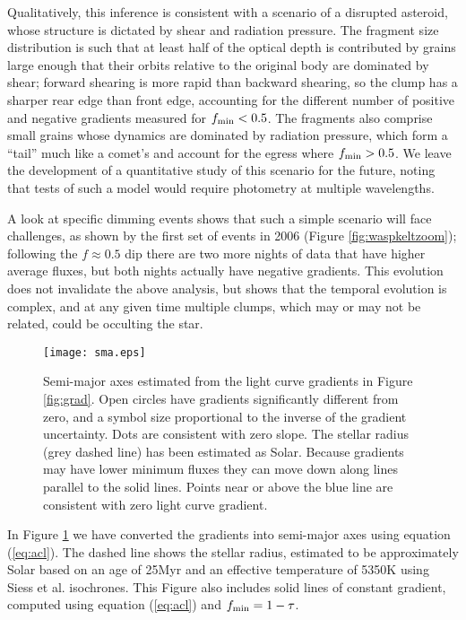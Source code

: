 \documentclass[]{rsos}
\begin{document}
Qualitatively, this inference is consistent with a scenario of a disrupted asteroid,
whose structure is dictated by shear and radiation pressure. The fragment size
distribution is such that at least half of the optical depth is contributed by grains
large enough that their orbits relative to the original body are dominated by shear;
forward shearing is more rapid than backward shearing, so the clump has a sharper rear
edge than front edge, accounting for the different number of positive and negative
gradients measured for $f_{\rm min} < 0.5$. The fragments also comprise small grains
whose dynamics are dominated by radiation pressure, which form a ``tail'' much like a
comet's and account for the egress where $f_{\rm min} > 0.5$. We leave the development of
a quantitative study of this scenario for the future, noting that tests of such a model
would require photometry at multiple wavelengths.

A look at specific dimming events shows that such a simple scenario will face challenges,
as shown by the first set of events in 2006 (Figure \ref{fig:waspkeltzoom}); following
the $f \approx 0.5$ dip there are two more nights of data that have higher average
fluxes, but both nights actually have negative gradients. This evolution does not
invalidate the above analysis, but shows that the temporal evolution is complex, and at
any given time multiple clumps, which may or may not be related, could be occulting the
star.

\begin{figure}
  \begin{center}
    \hspace{-0.5cm} \texttt{[image: sma.eps]}
    \caption{Semi-major axes estimated from the light curve gradients in Figure
      \ref{fig:grad}. Open circles have gradients significantly different from zero, and
      a symbol size proportional to the inverse of the gradient uncertainty. Dots are
      consistent with zero slope. The stellar radius (grey dashed line) has been
      estimated as Solar. Because gradients may have lower minimum fluxes they can move
      down along lines parallel to the solid lines. Points near or above the blue line
      are consistent with zero light curve gradient.}\label{fig:sma}
  \end{center}
\end{figure}

In Figure \ref{fig:sma} we have converted the gradients into semi-major axes using
equation (\ref{eq:acl}). The dashed line shows the stellar radius, estimated to be
approximately Solar based on an age of 25Myr \cite{2013AstL...39..776P} and an effective
temperature of 5350K \cite{2014A&A...563A.139P} using Siess et
al. \cite{2000A&A...358..593S} isochrones. This Figure also includes solid lines of
constant gradient, computed using equation (\ref{eq:acl}) and $f_{\rm min} = 1-\tau$.
\end{document}
